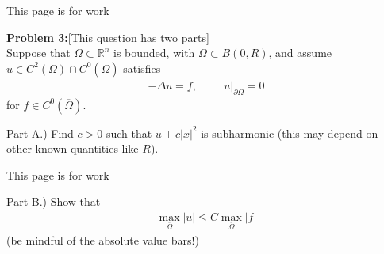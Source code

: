 \documentclass{article}
\newcommand{\R}{{\mathbb{R}}}
\newcommand{\cl}[1]{{\overline{#1}}}
\newcommand{\pd}{\partial}
\begin{document}
This page is for work
\newpage



\textbf{Problem 3:}[This question has two parts] \\

Suppose that $\Omega \subset \R^{n}$ is bounded, with $\Omega \subset B(0,R)$, and assume $u \in C^{2}(\Omega) \cap C^{0}(\cl{\Omega})$ satisfies
\begin{align*}
	-\Delta u = f, \hspace{1cm} u|_{\pd \Omega} = 0
\end{align*}
for $f \in C^{0}(\cl{\Omega})$. 

Part A.) Find $c>0$ such that $u + c|x|^{2}$ is subharmonic (this may depend on other known quantities like $R$). 


\newpage

This page is for work
\newpage

Part B.) Show that 
\begin{align*}
	\max_{\cl{\Omega}} |u| \leq C \max_{\cl{\Omega}} |f|
\end{align*}
(be mindful of the absolute value bars!)
\end{document}

